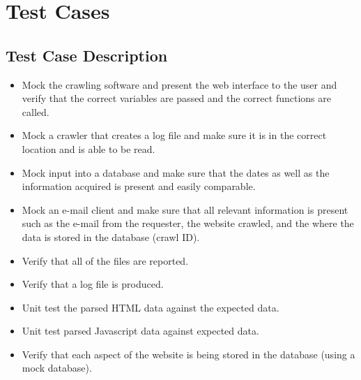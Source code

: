 \section{Test Cases}
\subsection{Test Case Description}
\begin{itemize}
    \item Mock the crawling software and present the web interface to the user and verify that the correct variables are passed and the correct functions are called.
    \item Mock a crawler that creates a log file and make sure it is in the correct location and is able to be read.
    \item Mock input into a database and make sure that the dates as well as the information acquired is present and easily comparable.
    \item Mock an e-mail client and make sure that all relevant information is present such as the e-mail from the requester, the website crawled, and the where the data is stored in the database (crawl ID).
    \item Verify that all of the files are reported.
    \item Verify that a log file is produced.
    \item Unit test the parsed HTML data against the expected data.
    \item Unit test parsed Javascript data against expected data.
    \item Verify that each aspect of the website is being stored in the database (using a mock database).
\end{itemize}
